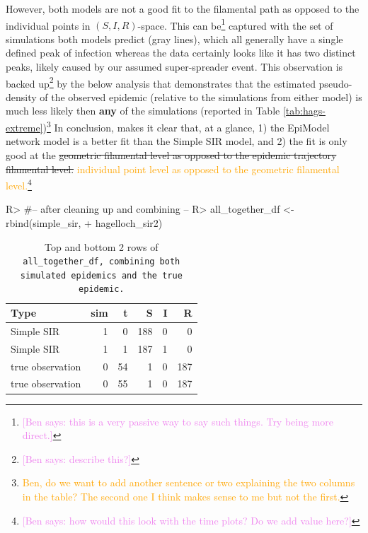 \documentclass[
  shortnames]{jss}
\begin{document}
However, both models are not a good fit to the filamental path as
opposed to the individual points in \((S, I, R)\)-space. This can
be\footnote{\textcolor{violet}{[Ben says: this is a very passive way to say such things. Try being more direct.]}}
captured with the set of simulations both models predict (gray lines),
which all generally have a single defined peak of infection whereas the
data certainly looks like it has two distinct peaks, likely caused by
our assumed super-spreader event. This observation is backed
up\footnote{\textcolor{violet}{[Ben says: describe this?]}} by the below
analysis that demonstrates that the estimated pseudo-density of the
observed epidemic (relative to the simulations from either model) is
much less likely then \textbf{any} of the simulations (reported in Table
\ref{tab:hags-extreme})\footnote{\textcolor{orange}{Ben, do we want to add another sentence or two explaining the two columns in the table?  The second one I think makes sense to me but not the first.}}
In conclusion,  makes it clear that, at a glance, 1) the
EpiModel network model is a better fit than the Simple SIR model, and 2)
the fit is only good at the
\sout{geometric filamental level as opposed to the epidemic trajectory filamental level.}
\textcolor{orange}{individual point level as opposed to the geometric filamental level.}\footnote{\textcolor{violet}{[Ben says: how would this look with the time plots? Do we add value here?]}}

\begin{CodeChunk}
\begin{CodeInput}
R> #-- after cleaning up and combining --
R> all_together_df <- rbind(simple_sir,
+                          hagelloch_sir2)
\end{CodeInput}
\end{CodeChunk}

\begin{CodeChunk}
\begin{table}[!h]

\caption{\label{tab:cif-all-together-df}Top and bottom 2 rows of \tt{all\_together\_df}\textnormal{, combining both simulated epidemics and the true epidemic.}}
\centering
\begin{tabular}[t]{lrrrrr}
\toprule
Type & sim & t & S & I & R\\
\midrule
Simple SIR & 1 & 0 & 188 & 0 & 0\\
Simple SIR & 1 & 1 & 187 & 1 & 0\\
true observation & 0 & 54 & 1 & 0 & 187\\
true observation & 0 & 55 & 1 & 0 & 187\\
\bottomrule
\end{tabular}
\end{table}

\end{CodeChunk}
\end{document}
